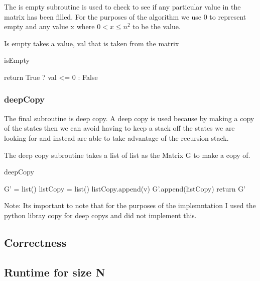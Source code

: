 \documentclass{sig-alternate}
\begin{document}
The is empty subroutine is used to check to see if any particular value in the matrix has been filled. 
For the purposes of the algorithm we use 0 to represent empty and any value x where $0 < x \le n^2$ to be the value.

Is empty takes a value, val that is taken from the matrix
\begin{algorithm}
\caption{isEmpty}\label{isEmpty}
\begin{algorithmic}[1]
\State return True ? val <= 0 : False
\EndProcedure
\end{algorithmic}
\end{algorithm}



\subsubsection{deepCopy}
The final subroutine is deep copy. A deep copy is used because by making a copy of the states then we can avoid having
to keep a stack off the states we are looking for and instead are able to take advantage of the recursion stack.

The deep copy subroutine takes a list of list as the Matrix G to make a copy of. 
\begin{algorithm}
\caption{deepCopy}\label{deepCopy}
\begin{algorithmic}[1]
\State G' = list()
\State listCopy = list()
\State listCopy.append(v)
\EndFor
\State G'.append(listCopy)
\EndFor
\State return G'
\EndProcedure
\end{algorithmic}
\end{algorithm}

Note: Its important to note that for the purposes of the implemntation I used the python libray copy for deep copys and did not implement this.


\subsection{Correctness}

\subsection{Runtime for size N}

\end{document}
